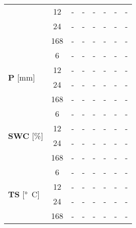 \begin{table}
\begin{tabular}{p{2.1cm}c|rr|rr|rr}
 & 12 & - & - & - & - & - & - \\
 & 24 & - & - & - & - & - & - \\
 & 168 & - & - & - & - & - & - \\
\cline{1-8}
\multirow[c]{4}{*}{{\textbf{P} [\si{mm}]}} & 6 & - & - & - & - & - & - \\
 & 12 & - & - & - & - & - & - \\
 & 24 & - & - & - & - & - & - \\
 & 168 & - & - & - & - & - & - \\
\cline{1-8}
\multirow[c]{4}{*}{{\textbf{SWC} [\si{\%}]}} & 6 & - & - & - & - & - & - \\
 & 12 & - & - & - & - & - & - \\
 & 24 & - & - & - & - & - & - \\
 & 168 & - & - & - & - & - & - \\
\cline{1-8}
\multirow[c]{4}{*}{{\textbf{TS} [\si{°C}]}} & 6 & - & - & - & - & - & - \\
 & 12 & - & - & - & - & - & - \\
 & 24 & - & - & - & - & - & - \\
 & 168 & - & - & - & - & - & - \\
\cline{1-8}
\bottomrule
\end{tabular}
\end{table}
